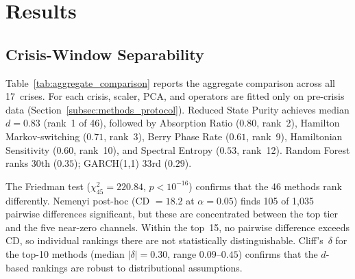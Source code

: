 \documentclass[3p]{elsarticle}
\begin{document}
\section{Results}\label{sec:results}

\subsection{Crisis-Window Separability}\label{subsec:separability}

Table~\ref{tab:aggregate_comparison} reports the aggregate comparison
across all 17~crises.  For each crisis, scaler, PCA, and operators
are fitted only on pre-crisis data
(Section~\ref{subsec:methods_protocol}).
Reduced State Purity achieves median $d = 0.83$ (rank~1 of 46),
followed by Absorption Ratio ($0.80$, rank~2), Hamilton
Markov-switching ($0.71$, rank~3), Berry Phase Rate ($0.61$, rank~9),
Hamiltonian Sensitivity ($0.60$, rank~10), and Spectral Entropy
($0.53$, rank~12).  Random Forest ranks 30th ($0.35$); GARCH(1,1)
33rd ($0.29$).

The Friedman test ($\chi^2_{45} = 220.84$, $p < 10^{-16}$)
confirms that the 46 methods rank differently.  Nemenyi post-hoc
(CD $= 18.2$ at $\alpha = 0.05$) finds 105 of 1{,}035 pairwise
differences significant, but these are concentrated between the
top tier and the five near-zero channels.  Within the top~15,
no pairwise difference exceeds CD, so individual rankings there are
not statistically distinguishable.
Cliff's~$\delta$ for the top-10 methods (median $|\delta| = 0.30$,
range $0.09$--$0.45$) confirms that the $d$-based rankings are
robust to distributional assumptions.
\end{document}
